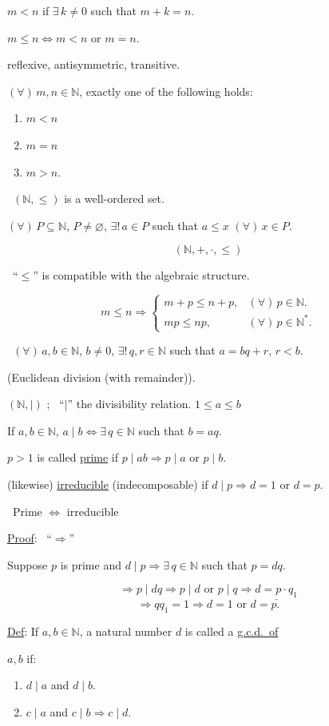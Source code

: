 \documentclass[12pt]{article}
\begin{document}
\noindent $m<n$ if $\exists\, k\neq 0$ such that $m+k=n$.

\noindent $m\leq n \Longleftrightarrow m<n$ or $m=n$.

\noindent reflexive, antisymmetric, transitive.

\bigskip
\noindent $(\forall)\,m,n\in\mathbb{N}$, exactly one of the following holds:

\begin{enumerate}
\item[(1)] $m<n$
\item[(2)] $m=n$
\item[(3)] $m>n$.
\end{enumerate}

\bigskip
\noindent{} \ $(\mathbb{N},\leq)$ is a well-ordered set.

\noindent $(\forall)\,P\subseteq\mathbb{N}$, $P\neq\varnothing$, $\exists!\,a\in P$ such that $a\leq x$ $(\forall)\,x\in P$.

\[
(\mathbb{N},+,\cdot,\leq)
\]

\bigskip
\noindent{} \ ``$\leq$'' is compatible with the algebraic structure.

\[
m\leq n \Rightarrow
\begin{cases}
m+p\leq n+p, & (\forall)\,p\in\mathbb{N}.\\
mp\leq np, & (\forall)\,p\in\mathbb{N}^*.
\end{cases}
\]

\bigskip
\noindent{} \ $(\forall)\,a,b\in\mathbb{N}$, $b\neq 0$, $\exists!\,q,r\in\mathbb{N}$ such that $a=bq+r$, $r<b$.

\noindent (Euclidean division (with remainder)).

\bigskip
\noindent $(\mathbb{N},\mid)$ ; \ ``$\mid$'' the divisibility relation. \hfill $1\leq a\leq b$

\noindent If $a,b\in\mathbb{N}$, $a\mid b \Leftrightarrow \exists\,q\in\mathbb{N}$ such that $b=aq$.

\bigskip
\noindent $p>1$ is called \underline{prime} if $p\mid ab \Rightarrow p\mid a$ or $p\mid b$.

\noindent (likewise) \underline{irreducible} (indecomposable) if $d\mid p \Rightarrow d=1$ or $d=p$.

\bigskip
\noindent{} \ Prime $\Leftrightarrow$ irreducible

\bigskip
\noindent\underline{Proof}: \ ``$\Rightarrow$''

\noindent Suppose $p$ is prime and $d\mid p \Rightarrow \exists\,q\in\mathbb{N}$ such that $p=dq$.

\[
\Rightarrow p\mid dq \Rightarrow p\mid d \text{ or } p\mid q \Rightarrow \underline{d=p\cdot q_1}
\]
\[
\Rightarrow qq_1=1 \Rightarrow d=1 \text{ or } d=p.
\]

\bigskip
\noindent\underline{Def}: If $a,b\in\mathbb{N}$, a natural number $d$ is called a \underline{g.c.d.\ of}

\noindent $a,b$ if:

\begin{enumerate}
\item[(1)] $d\mid a$ and $d\mid b$.
\item[(2)] $c\mid a$ and $c\mid b \Rightarrow c\mid d$.
\end{enumerate}
\end{document}
